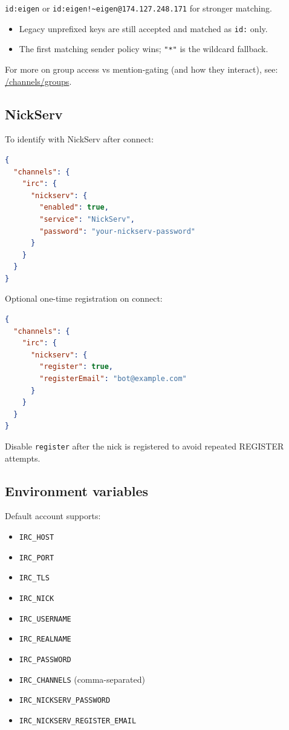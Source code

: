 \texttt{id:eigen} or \texttt{id:eigen!\textasciitilde{}eigen@174.127.248.171} for stronger matching.
\begin{itemize}
  \item Legacy unprefixed keys are still accepted and matched as \texttt{id:} only.
  \item The first matching sender policy wins; \texttt{"*"} is the wildcard fallback.
\end{itemize}


For more on group access vs mention-gating (and how they interact), see: \href{/channels/groups}{/channels/groups}.

\subsection{NickServ}


To identify with NickServ after connect:

\begin{lstlisting}[language=json]
{
  "channels": {
    "irc": {
      "nickserv": {
        "enabled": true,
        "service": "NickServ",
        "password": "your-nickserv-password"
      }
    }
  }
}
\end{lstlisting}


Optional one-time registration on connect:

\begin{lstlisting}[language=json]
{
  "channels": {
    "irc": {
      "nickserv": {
        "register": true,
        "registerEmail": "bot@example.com"
      }
    }
  }
}
\end{lstlisting}


Disable \texttt{register} after the nick is registered to avoid repeated REGISTER attempts.

\subsection{Environment variables}


Default account supports:

\begin{itemize}
  \item \texttt{IRC\_HOST}
  \item \texttt{IRC\_PORT}
  \item \texttt{IRC\_TLS}
  \item \texttt{IRC\_NICK}
  \item \texttt{IRC\_USERNAME}
  \item \texttt{IRC\_REALNAME}
  \item \texttt{IRC\_PASSWORD}
  \item \texttt{IRC\_CHANNELS} (comma-separated)
  \item \texttt{IRC\_NICKSERV\_PASSWORD}
  \item \texttt{IRC\_NICKSERV\_REGISTER\_EMAIL}
\end{itemize}


